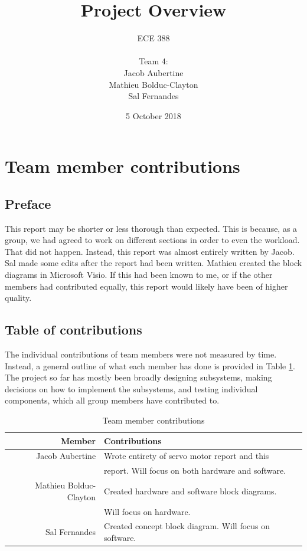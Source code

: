 \documentclass{article}
\title{Project Overview}
\date{5 October 2018}
\author{
	ECE 388
	\\
	\\
	Team 4:
	\\
	Jacob Aubertine
	\\
	Mathieu Bolduc-Clayton
	\\
	Sal Fernandes
}
\begin{document}
	\maketitle
	\newpage
	\tableofcontents
	\newpage

    \section{Team member contributions}
	    \subsection{Preface}
	    This report may be shorter or less thorough than expected. This is because, as a group, we had agreed to work on different sections in order to even the workload. That did not happen. Instead, this report was almost entirely written by Jacob. Sal  made some edits after the report had been written. Mathieu created the block diagrams in Microsoft Visio. If this had been known to me, or if the other members had contributed equally, this report would likely have been of higher quality.
	    
	    \subsection{Table of contributions}
	    The individual contributions of team members were not measured by time. Instead, a general outline of what each member has done is provided in Table \ref{tab:table1}. The project so far has mostly been broadly designing subsystems, making decisions on how to implement the subsystems, and testing individual components, which all group members have contributed to.
	    \begin{table}[h!]
  	    \begin{center}
            \caption{Team member contributions}
    		\label{tab:table1}
    		\begin{tabular}{r|l}
      			\textbf{Member} & \textbf{Contributions} \\
			    \hline
      			Jacob Aubertine & Wrote entirety of servo motor report and this\\
      			 & report. Will focus on both hardware and software. \\
      			Mathieu Bolduc-Clayton & Created hardware and software block diagrams.\\
      			 & Will focus on hardware.\\
      			Sal Fernandes & Created concept block diagram. Will focus on software.\\
   			\end{tabular}
  	    \end{center}
	\end{table}
\end{document}
